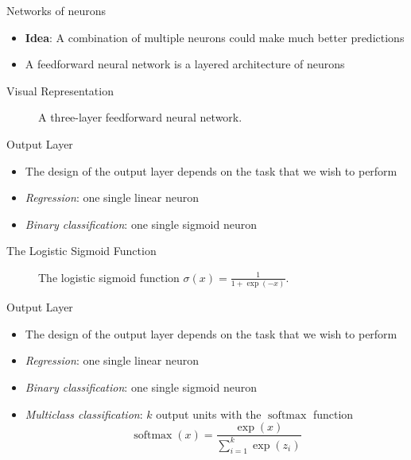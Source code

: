 \documentclass{beamer}
\DeclareMathOperator{\softmax}{softmax}
\begin{document}
	\begin{frame}{Networks of neurons}
		\begin{itemize}
			\item <1-> \textbf{Idea}: A combination of multiple neurons could make much better predictions
			\item <2-> A feedforward neural network is a layered architecture of neurons
		\end{itemize}
	\end{frame}
	\begin{frame}{Visual Representation}
		\begin{figure}
			
			\caption{A three-layer feedforward neural network.}
		\end{figure}
	\end{frame}
	\begin{frame}{Output Layer}
		\begin{itemize}
			\item <1-> The design of the output layer depends on the task that we wish to perform
			\item <2-> \emph{Regression}: one single linear neuron
			\item <3-> \emph{Binary classification}: one single sigmoid neuron
		\end{itemize}
	\end{frame}
	\begin{frame}{The Logistic Sigmoid Function}
		\begin{figure}
			\begin{center}
				
			\end{center}
			\caption{The logistic sigmoid function $\sigma(x) = \frac1{1+\exp(-x)}$.}
			\label{fig:sigmoid}
		\end{figure}
	\end{frame}
	\begin{frame}{Output Layer}
		\begin{itemize}
			\item <1-> The design of the output layer depends on the task that we wish to perform
			\item <1-> \emph{Regression}: one single linear neuron
			\item <1-> \emph{Binary classification}: one single sigmoid neuron
			\item <1-> \emph{Multiclass classification}: $k$ output units with the $\softmax$ function
			\begin{equation}\label{eq:softmax}
			\softmax(x) = \frac{\exp(x)}{\sum_{i=1}^{k}\exp(z_i)}
			\end{equation}
		\end{itemize}
	\end{frame}
\end{document}
